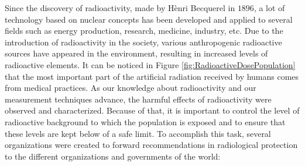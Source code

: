 Since the discovery of radioactivity, made by Hènri Becquerel in $1896$, a lot of technology based on nuclear concepts has been developed and applied to several fields such as energy production, research, medicine, industry, etc. Due to the introduction of radioactivity in the society, various anthropogenic radioactive sources have appeared in the environment, resulting in increased levels of radioactive elements.  It can be noticed in Figure \ref{fig:RadioactiveDosePopulation} that the most important part of the artificial radiation received by humans comes from medical practices. As our knowledge about radioactivity and our measurement techniques advance, the harmful effects of radioactivity were observed and characterized. Because of that, it is important to control the level of radioactive background to which the population is exposed and to ensure that these levels are kept below of a safe limit. To accomplish this task, several organizations were created to forward recommendations in radiological protection to the different organizations and governments of the world:

